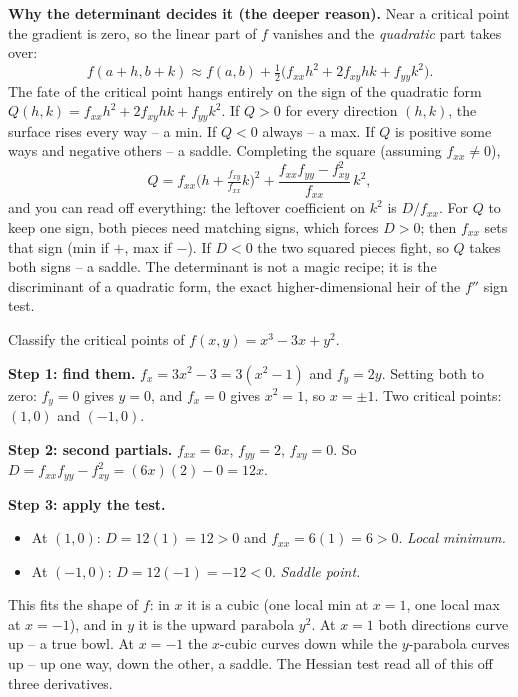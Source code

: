\begin{whybox}
\textbf{Why the determinant decides it (the deeper reason).} Near a critical point
the gradient is zero, so the linear part of $f$ vanishes and the \emph{quadratic}
part takes over:
\[
  f(a+h,b+k) \approx f(a,b) + \tfrac12\big(f_{xx}h^2 + 2f_{xy}hk + f_{yy}k^2\big).
\]
The fate of the critical point hangs entirely on the sign of the quadratic form
$Q(h,k)=f_{xx}h^2 + 2f_{xy}hk + f_{yy}k^2$. If $Q>0$ for every direction $(h,k)$,
the surface rises every way -- a min. If $Q<0$ always -- a max. If $Q$ is positive
some ways and negative others -- a saddle. Completing the square (assuming
$f_{xx}\neq 0$),
\[
  Q = f_{xx}\Big(h + \tfrac{f_{xy}}{f_{xx}}k\Big)^2
      + \frac{f_{xx}f_{yy}-f_{xy}^2}{f_{xx}}\,k^2,
\]
and you can read off everything: the leftover coefficient on $k^2$ is $D/f_{xx}$.
For $Q$ to keep one sign, both pieces need matching signs, which forces $D>0$;
then $f_{xx}$ sets that sign (min if $+$, max if $-$). If $D<0$ the two squared
pieces fight, so $Q$ takes both signs -- a saddle. The determinant is not a magic
recipe; it is the discriminant of a quadratic form, the exact higher-dimensional
heir of the $f''$ sign test.
\end{whybox}

\begin{example}
\label{ch33:ex-classify}
Classify the critical points of $f(x,y)=x^3 - 3x + y^2$.

\textbf{Step 1: find them.} $f_x = 3x^2 - 3 = 3(x^2-1)$ and $f_y = 2y$. Setting
both to zero: $f_y=0$ gives $y=0$, and $f_x=0$ gives $x^2=1$, so $x=\pm 1$. Two
critical points: $(1,0)$ and $(-1,0)$.

\textbf{Step 2: second partials.} $f_{xx}=6x$, $f_{yy}=2$, $f_{xy}=0$. So
$D = f_{xx}f_{yy}-f_{xy}^2 = (6x)(2) - 0 = 12x$.

\textbf{Step 3: apply the test.}
\begin{itemize}
\item At $(1,0)$: $D = 12(1) = 12 > 0$ and $f_{xx}=6(1)=6>0$. \emph{Local
minimum.}
\item At $(-1,0)$: $D = 12(-1) = -12 < 0$. \emph{Saddle point.}
\end{itemize}
This fits the shape of $f$: in $x$ it is a cubic (one local min at $x=1$, one local
max at $x=-1$), and in $y$ it is the upward parabola $y^2$. At $x=1$ both
directions curve up -- a true bowl. At $x=-1$ the $x$-cubic curves down while the
$y$-parabola curves up -- up one way, down the other, a saddle. The Hessian test
read all of this off three derivatives.
\end{example}

